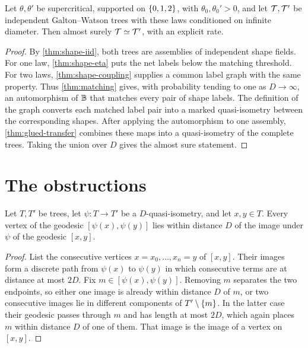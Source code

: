 \begin{proposition}
\label{thm:hairy}
\leanok
{}
Let $\theta,\theta'$ be supercritical, supported on $\{0,1,2\}$, with $\theta_0,\theta_0'>0$,
and let $\mathcal{T},\mathcal{T}'$ be independent Galton--Watson trees with these laws conditioned on infinite
diameter. Then almost surely $\mathcal{T}\simeq\mathcal{T}'$, with an explicit rate.
\end{proposition}

\begin{proof}
\leanok
{}
By \cref{thm:shape-iid}, both trees are assemblies of independent shape fields. For one law,
\cref{thm:shape-eta} puts the net labels below the matching threshold. For two laws,
\cref{thm:shape-coupling} supplies a common label graph with the same property. Thus
\cref{thm:matching} gives, with probability tending to one as $D\to\infty$, an automorphism of
$\mathbb{B}$ that matches every pair of shape labels. The definition of the graph converts each
matched label pair into a marked quasi-isometry between the corresponding shapes. After applying
the automorphism to one assembly, \cref{thm:glued-transfer} combines these maps into a
quasi-isometry of the complete trees. Taking the union over $D$ gives the almost sure statement.
\end{proof}

\section{The obstructions}

\begin{lemma}
\label{thm:tree-stability}
\leanok
{}
Let $T,T'$ be trees, let $\psi\colon T\to T'$ be a $D$-quasi-isometry, and let $x,y\in T$.
Every vertex of the geodesic $[\psi(x),\psi(y)]$ lies within distance $D$ of the image under
$\psi$ of the geodesic $[x,y]$.
\end{lemma}

\begin{proof}
\leanok
List the consecutive vertices $x=x_0,\dots,x_n=y$ of $[x,y]$. Their images form a discrete
path from $\psi(x)$ to $\psi(y)$ in which consecutive terms are at distance at most $2D$.
Fix $m\in[\psi(x),\psi(y)]$. Removing $m$ separates the two endpoints, so either one image is
already within distance $D$ of $m$, or two consecutive images lie in different components of
$T'\setminus\{m\}$. In the latter case their geodesic passes through $m$ and has length at most
$2D$, which again places $m$ within distance $D$ of one of them. That image is the image of a
vertex on $[x,y]$.
\end{proof}

